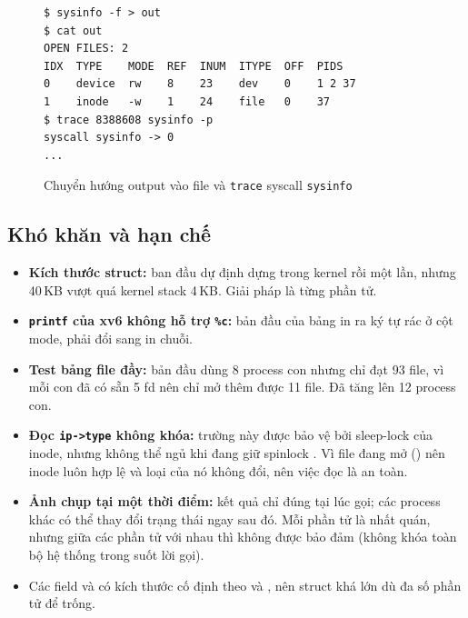\begin{figure}[H]
\begin{verbatim}
$ sysinfo -f > out
$ cat out
OPEN FILES: 2
IDX  TYPE    MODE  REF  INUM  ITYPE  OFF  PIDS
0    device  rw    8    23    dev    0    1 2 37
1    inode   -w    1    24    file   0    37
$ trace 8388608 sysinfo -p
syscall sysinfo -> 0
...
\end{verbatim}
\caption{Chuyển hướng output vào file và \texttt{trace} syscall \texttt{sysinfo}}
\label{fig:demo-redirect}
\end{figure}

\subsection{Khó khăn và hạn chế}

\begin{itemize}
  \item \textbf{Kích thước struct:} ban đầu dự định dựng 
        trong kernel rồi  một lần, nhưng 40\,KB vượt quá kernel stack
        4\,KB. Giải pháp là  từng phần tử.
  \item \textbf{\texttt{printf} của xv6 không hỗ trợ \texttt{\%c}:} bản đầu
        của bảng in ra ký tự rác ở cột mode, phải đổi sang in chuỗi.
  \item \textbf{Test bảng file đầy:} bản đầu dùng 8 process con nhưng chỉ đạt
        93 file, vì mỗi con đã có sẵn 5 fd nên chỉ mở thêm được 11 file. Đã tăng
        lên 12 process con.
  \item \textbf{Đọc \texttt{ip->type} không khóa:} trường này được bảo vệ bởi
        sleep-lock của inode, nhưng không thể ngủ khi đang giữ spinlock
        . Vì file đang mở () nên inode luôn hợp lệ
        và loại của nó không đổi, nên việc đọc là an toàn.
  \item \textbf{Ảnh chụp tại một thời điểm:} kết quả chỉ đúng tại lúc gọi; các
        process khác có thể thay đổi trạng thái ngay sau đó. Mỗi phần tử là nhất
        quán, nhưng giữa các phần tử với nhau thì không được bảo đảm
        (không khóa toàn bộ hệ thống trong suốt lời gọi).
  \item Các field  và  có kích thước cố định theo
         và , nên struct khá lớn dù đa số phần tử để trống.
\end{itemize}
